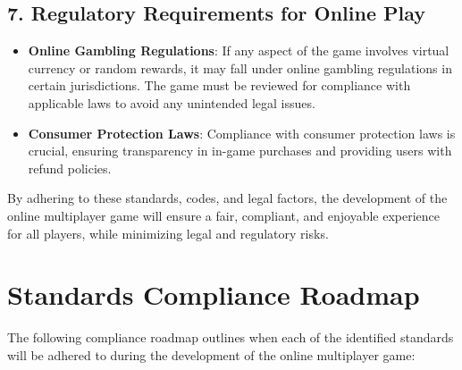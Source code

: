 \subsection*{7. Regulatory Requirements for Online Play}
\begin{itemize}
    \item \textbf{Online Gambling Regulations}: If any aspect of the game involves virtual currency or random rewards, it may fall under online gambling regulations in certain jurisdictions. The game must be reviewed for compliance with applicable laws to avoid any unintended legal issues.
    \item \textbf{Consumer Protection Laws}: Compliance with consumer protection laws is crucial, ensuring transparency in in-game purchases and providing users with refund policies.
\end{itemize}

By adhering to these standards, codes, and legal factors, the development of the online multiplayer game will ensure a fair, compliant, and enjoyable experience for all players, while minimizing legal and regulatory risks.

\section{Standards Compliance Roadmap}

The following compliance roadmap outlines when each of the identified standards will be adhered to during the development of the online multiplayer game:

